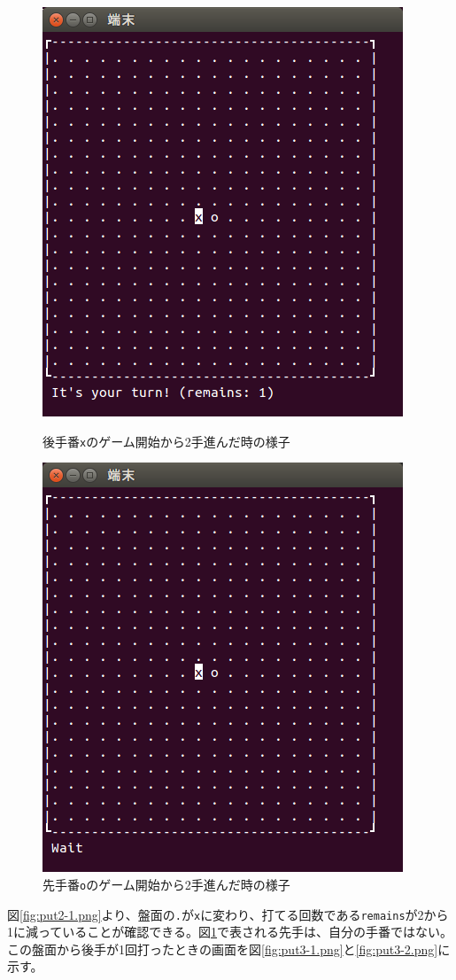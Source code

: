 \documentclass[a4j, titlepage, 10pt]{jsarticle}
\newcommand{\code}[1]{\texttt{#1}}
\begin{document}
\begin{figure}[H]
  \begin{minipage}{0.5\hsize}
    \centering
    \includegraphics[scale=0.5]{img/put2-1.png}
    \caption{後手番\code{x}のゲーム開始から2手進んだ時の様子}
    \label{fig:put2-1.png}
  \end{minipage}
  \begin{minipage}{0.5\hsize}
    \includegraphics[scale=0.5]{img/put2-2.png}
    \caption{先手番\code{o}のゲーム開始から2手進んだ時の様子}
    \label{fig:put2-2.png}
  \end{minipage}
\end{figure}
図\ref{fig:put2-1.png}より、盤面の\texttt{.}が\texttt{x}に変わり、打てる回数である\texttt{remains}が2から1に減っていることが確認できる。図\ref{fig:put2-2.png}で表される先手は、自分の手番ではない。この盤面から後手が1回打ったときの画面を図\ref{fig:put3-1.png}と\ref{fig:put3-2.png}に示す。
\end{document}

